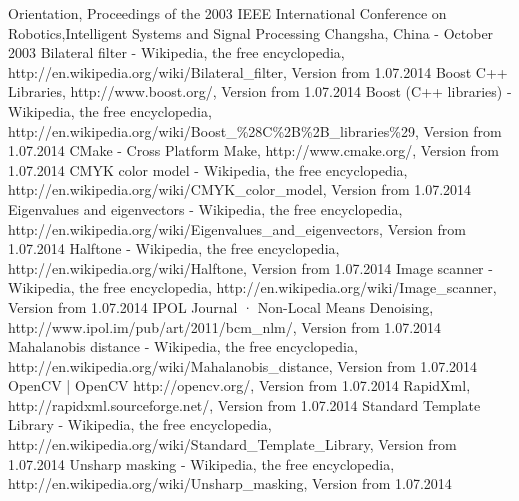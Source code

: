 \documentclass[a4paper,onecolumn,oneside,12pt]{memoir}
\begin{document}
\begin{thebibliography}{99}
{          Orientation, Proceedings of the 2003 IEEE International Conference on Robotics,Intelligent
          Systems and Signal Processing Changsha, China - October 2003}
          {Bilateral filter - Wikipedia, the free encyclopedia,
          http://en.wikipedia.org/wiki/Bilateral\_filter, Version from 1.07.2014}
          {Boost C++ Libraries,
          http://www.boost.org/, Version from 1.07.2014}
          {Boost (C++ libraries) - Wikipedia, the free encyclopedia,
          http://en.wikipedia.org/wiki/Boost\_\%28C\%2B\%2B\_libraries\%29, Version from 1.07.2014}
          {CMake - Cross Platform Make,
          http://www.cmake.org/, Version from 1.07.2014}
          {CMYK color model - Wikipedia, the free encyclopedia,
          http://en.wikipedia.org/wiki/CMYK\_color\_model, Version from 1.07.2014}
          {Eigenvalues and eigenvectors - Wikipedia, the free encyclopedia,
          http://en.wikipedia.org/wiki/Eigenvalues\_and\_eigenvectors, Version from 1.07.2014}
          {Halftone - Wikipedia, the free encyclopedia,
          http://en.wikipedia.org/wiki/Halftone, Version from 1.07.2014}
          {Image scanner - Wikipedia, the free encyclopedia,
          http://en.wikipedia.org/wiki/Image\_scanner, Version from 1.07.2014}
          {IPOL Journal · Non-Local Means Denoising,
          http://www.ipol.im/pub/art/2011/bcm\_nlm/, Version from 1.07.2014}
          {Mahalanobis distance - Wikipedia, the free encyclopedia, 
          http://en.wikipedia.org/wiki/Mahalanobis\_distance, Version from 1.07.2014}
          {OpenCV | OpenCV
          http://opencv.org/, Version from 1.07.2014}
          {RapidXml,
          http://rapidxml.sourceforge.net/, Version from 1.07.2014}
          {Standard Template Library - Wikipedia, the free encyclopedia,
          http://en.wikipedia.org/wiki/Standard\_Template\_Library, Version from 1.07.2014}
          {Unsharp masking - Wikipedia, the free encyclopedia,
          http://en.wikipedia.org/wiki/Unsharp\_masking, Version from 1.07.2014}

\end{thebibliography}
\end{document}
